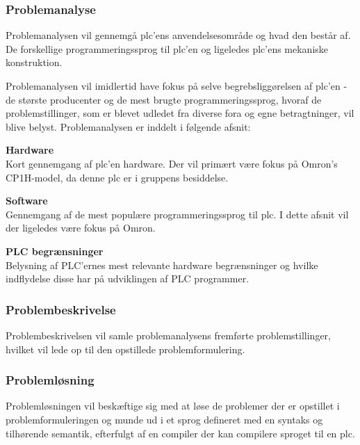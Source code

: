 \label{sec:rapportstruktur}


\subsubsection*{Problemanalyse}
Problemanalysen vil gennemgå \gls{plc}'ens anvendelsesområde og hvad den består af. De forskellige programmeringssprog til \gls{plc}'en og ligeledes \gls{plc}'ens mekaniske konstruktion. 

Problemanalysen vil imidlertid have fokus på selve begrebsliggørelsen af \gls{plc}'en - de største producenter og de mest brugte programmeringssprog, hvoraf de problemstillinger, som er blevet udledet fra diverse fora og egne betragtninger, vil blive belyst. Problemanalysen er inddelt i følgende afsnit:

\begin{itemize_small}
    \item \textbf{Hardware} \\
    Kort gennemgang af \gls{plc}'en hardware. Der vil primært være fokus på Omron's CP1H-model, da denne \gls{plc} er i gruppens besiddelse.
    \item \textbf{Software} \\
    Gennemgang af de mest populære programmeringssprog til \gls{plc}. I dette afsnit vil der ligeledes være fokus på Omron.
    \item \textbf{PLC begrænsninger} \\
    Belysning af PLC'ernes mest relevante hardware begrænsninger og hvilke indflydelse disse har på udviklingen af PLC programmer.
\end{itemize_small}

\subsubsection*{Problembeskrivelse}
Problembeskrivelsen vil samle problemanalysens fremførte problemstillinger, hvilket vil lede op til den opstillede problemformulering.

\subsubsection*{Problemløsning}
Problemløsningen vil beskæftige sig med at løse de problemer der er opstillet i problemformuleringen og munde ud i et sprog defineret med en syntaks og tilhørende semantik, efterfulgt af en compiler der kan compilere sproget til en \gls{plc}.

